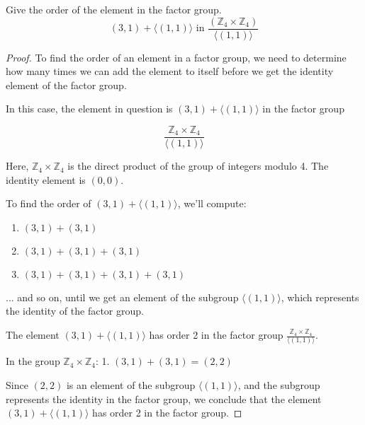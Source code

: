 \documentclass[12pt]{amsart}
\theoremstyle{definition}
\numberwithin{equation}{section}
\theoremstyle{plain}
\newcommand{\Z}{\mathbb{Z}}
\begin{document}
\begin{exercise}{12} Give the order of the element in the factor group.
\[(3,1) + \langle(1,1)\rangle \text{ in } \frac{(\Z_4 \times \Z_4)}{\langle(1,1)\rangle}\]
        
    \begin{proof}
To find the order of an element in a factor group, we need to determine how many times we can add the element to itself before we get the identity element of the factor group.

In this case, the element in question is \( (3,1) + \langle(1,1)\rangle \) in the factor group 

\[
\frac{\Z_4 \times \Z_4}{\langle(1,1)\rangle}
\]

Here, \( \Z_4 \times \Z_4 \) is the direct product of the group of integers modulo 4. The identity element is \( (0,0) \). 

To find the order of \( (3,1) + \langle(1,1)\rangle \), we'll compute:

\begin{enumerate}
    \item \( (3,1) + (3,1) \)
    \item \( (3,1) + (3,1) + (3,1) \)
    \item \( (3,1) + (3,1) + (3,1) + (3,1) \)
\end{enumerate}
... and so on, until we get an element of the subgroup \( \langle(1,1)\rangle \), which represents the identity of the factor group.

The element \( (3,1) + \langle(1,1)\rangle \) has order 2 in the factor group \(\frac{\Z_4 \times \Z_4}{\langle(1,1)\rangle}\).

In the group \( \Z_4 \times \Z_4 \):
1. \( (3,1) + (3,1) = (2,2) \)

Since \( (2,2) \) is an element of the subgroup \( \langle(1,1)\rangle \), and the subgroup represents the identity in the factor group, we conclude that the element \( (3,1) + \langle(1,1)\rangle \) has order 2 in the factor group.
        \end{proof}
\end{exercise}
\vspace*{20pt}
\end{document}

